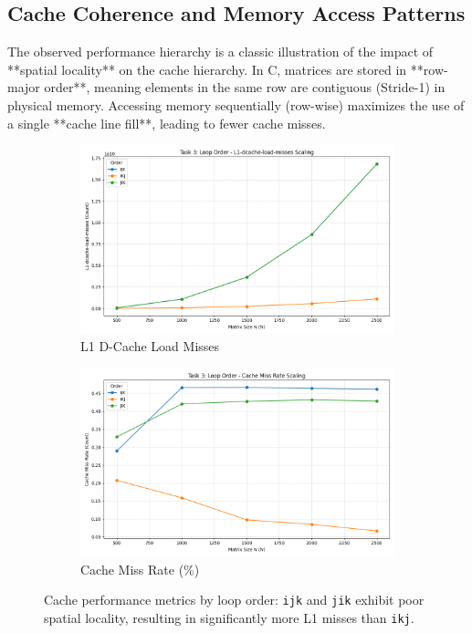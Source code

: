 \documentclass[11pt, a4paper]{article}
\begin{document}
\subsection{Cache Coherence and Memory Access Patterns}

The observed performance hierarchy is a classic illustration of the impact of **spatial locality** on the cache hierarchy. In C, matrices are stored in **row-major order**, meaning elements in the same row are contiguous (Stride-1) in physical memory. Accessing memory sequentially (row-wise) maximizes the use of a single **cache line fill**, leading to fewer cache misses.
\begin{figure}[h] %
    \centering
    \begin{subfigure}[b]{0.48\textwidth}
        \centering
        \includegraphics[width=\textwidth]{plots/task_3_loop_order_-__l1-dcache-load-misses.png}
        \caption{L1 D-Cache Load Misses}
        \label{fig:t3_l1_misses_order}
    \end{subfigure}
    \hfill
    \begin{subfigure}[b]{0.48\textwidth}
        \centering
        \includegraphics[width=\textwidth]{plots/task_3_loop_order_-__cache_miss_rate.png}
        \caption{Cache Miss Rate (\%)}
        \label{fig:t3_cache_miss_rate}
    \end{subfigure}
    \caption{Cache performance metrics by loop order: \texttt{ijk} and \texttt{jik} exhibit poor spatial locality, resulting in significantly more L1 misses than \texttt{ikj}.}
\end{figure}
\end{document}
